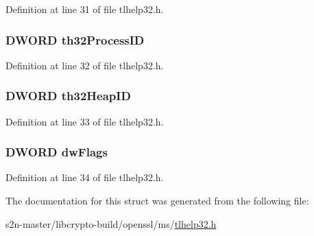 Definition at line 31 of file tlhelp32.\+h.

\subsubsection[{\texorpdfstring{th32\+Process\+ID}{th32ProcessID}}]{\setlength{\rightskip}{0pt plus 5cm}D\+W\+O\+RD th32\+Process\+ID}\hypertarget{structtag_h_e_a_p_l_i_s_t32_a4e94a85eb6671f7346bc1fb284f56186}{}\label{structtag_h_e_a_p_l_i_s_t32_a4e94a85eb6671f7346bc1fb284f56186}


Definition at line 32 of file tlhelp32.\+h.

\subsubsection[{\texorpdfstring{th32\+Heap\+ID}{th32HeapID}}]{\setlength{\rightskip}{0pt plus 5cm}D\+W\+O\+RD th32\+Heap\+ID}\hypertarget{structtag_h_e_a_p_l_i_s_t32_a382f1b4f880ccd90252ea23ad7adec98}{}\label{structtag_h_e_a_p_l_i_s_t32_a382f1b4f880ccd90252ea23ad7adec98}


Definition at line 33 of file tlhelp32.\+h.

\subsubsection[{\texorpdfstring{dw\+Flags}{dwFlags}}]{\setlength{\rightskip}{0pt plus 5cm}D\+W\+O\+RD dw\+Flags}\hypertarget{structtag_h_e_a_p_l_i_s_t32_a4d2f405b1141000eb2af256e0fc8b98b}{}\label{structtag_h_e_a_p_l_i_s_t32_a4d2f405b1141000eb2af256e0fc8b98b}


Definition at line 34 of file tlhelp32.\+h.



The documentation for this struct was generated from the following file\+:\begin{DoxyCompactItemize}
\item 
s2n-\/master/libcrypto-\/build/openssl/ms/\hyperlink{tlhelp32_8h}{tlhelp32.\+h}\end{DoxyCompactItemize}
